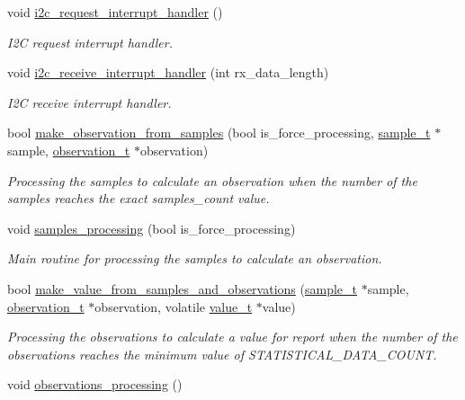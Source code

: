 \begin{DoxyCompactItemize}
void \hyperlink{i2c-th_8ino_ac816bd8aafe77e7a571574c8a26eead5}{i2c\+\_\+request\+\_\+interrupt\+\_\+handler} ()
\begin{DoxyCompactList}\small\item\em I2C request interrupt handler. \end{DoxyCompactList}\item 
void \hyperlink{i2c-th_8ino_a6e27532df66f6bf186654355def5c9af}{i2c\+\_\+receive\+\_\+interrupt\+\_\+handler} (int rx\+\_\+data\+\_\+length)
\begin{DoxyCompactList}\small\item\em I2C receive interrupt handler. \end{DoxyCompactList}\item 
bool \hyperlink{i2c-th_8ino_a1c5769e114267b210fb3812064d01dd0}{make\+\_\+observation\+\_\+from\+\_\+samples} (bool is\+\_\+force\+\_\+processing, \hyperlink{structsample__t}{sample\+\_\+t} $\ast$sample, \hyperlink{structobservation__t}{observation\+\_\+t} $\ast$observation)
\begin{DoxyCompactList}\small\item\em Processing the samples to calculate an observation when the number of the samples reaches the exact samples\+\_\+count value. \end{DoxyCompactList}\item 
void \hyperlink{i2c-th_8ino_aba0fc91d6c2829df00a9d5fe2b921c90}{samples\+\_\+processing} (bool is\+\_\+force\+\_\+processing)
\begin{DoxyCompactList}\small\item\em Main routine for processing the samples to calculate an observation. \end{DoxyCompactList}\item 
bool \hyperlink{i2c-th_8ino_ab301e4d552826ef91458f52963949a1d}{make\+\_\+value\+\_\+from\+\_\+samples\+\_\+and\+\_\+observations} (\hyperlink{structsample__t}{sample\+\_\+t} $\ast$sample, \hyperlink{structobservation__t}{observation\+\_\+t} $\ast$observation, volatile \hyperlink{structvalue__t}{value\+\_\+t} $\ast$value)
\begin{DoxyCompactList}\small\item\em Processing the observations to calculate a value for report when the number of the observations reaches the minimum value of S\+T\+A\+T\+I\+S\+T\+I\+C\+A\+L\+\_\+\+D\+A\+T\+A\+\_\+\+C\+O\+U\+NT. \end{DoxyCompactList}\item 
void \hyperlink{i2c-th_8ino_a4c8e037e3b3f4c043abf3de8cf57fe68}{observations\+\_\+processing} ()

\end{DoxyCompactItemize}
